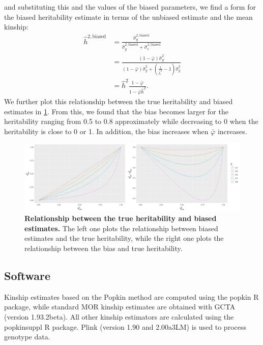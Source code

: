 \documentclass[11pt]{article}
\begin{document}
and substituting this and the values of the biased parameters, we find a form for the biased heritability estimate in terms of the unbiased estimate and the mean kinship:
\begin{align*}
  \hat{h}^{2,\text{biased}}
  &=
    \frac{
    \hat{\sigma}^{2,\text{biased}}_g
    }{
    \hat{\sigma}^{2,\text{biased}}_g + \hat{\sigma}^{2,\text{biased}}_e
    }
  \\
  &=
    \frac{
    (1 - \bar{\varphi}) \hat{\sigma}^2_g
    }{
    (1 - \bar{\varphi}) \hat{\sigma}^2_g
    + \left( \frac{ 1 }{ \hat{h}^2 } - 1 \right) \hat{\sigma}^2_g 
    }
  \\
  &=
    \hat{h}^2
    \frac{
    1 - \bar{\varphi}
    }{
    1 - \bar{\varphi} \hat{h}^2
    }
    .
\end{align*}
We further plot this relationship between the true heritability and biased estimates in \cref{fig:h}. From this, we found that the bias becomes larger for the heritability ranging from 0.5 to 0.8 approximately while decreasing to 0 when the heritability is close to 0 or 1. In addition, the bias increases when $\bar{\varphi}$ increases.
\begin{figure}[bp!]
  \centering
  \includegraphics[width=\textwidth]{data/h_both.png}
  \caption{
    {\bf Relationship between the true heritability and biased estimates.}
    The left one plots the relationship between biased estimates and the true heritability, while the right one plots the relationship between the bias and true heritability.
    }
  \label{fig:h}
\end{figure}


\subsection{Software}

Kinship estimates based on the Popkin method are computed using the popkin R package, while standard MOR kinship estimates are obtained with GCTA (version 1.93.2beta). All other kinship estimators are calculated using the popkinsuppl R package. Plink (version 1.90 and 2.00a3LM) is used to process genotype data.
\end{document}
